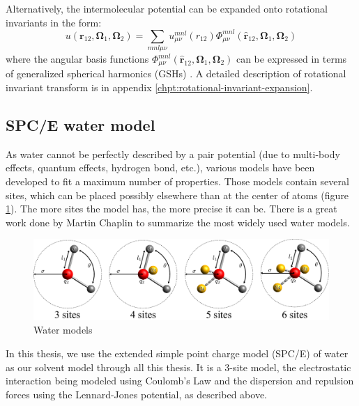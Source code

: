 Alternatively, the intermolecular potential can be expanded onto rotational
invariants in the form:
\begin{equation}
u(\mathbf{r}_{12},\mathbf{\Omega}_{1},\mathbf{\Omega}_{2})=\sum_{mnl\mu\nu}u_{\mu\nu}^{mnl}(r_{12})\Phi_{\mu\nu}^{mnl}(\hat{\mathbf{r}}_{12},\mathbf{\Omega}_{1},\mathbf{\Omega}_{2})
\end{equation}
where the angular basis functions $\Phi_{\mu\nu}^{mnl}(\hat{\mathbf{r}}_{12},\mathbf{\Omega}_{1},\mathbf{\Omega}_{2})$
can be expressed in terms of generalized spherical harmonics (\acs{GSH}s)
\citep{Gray-Gubbins}. A detailed description of rotational invariant
transform is in appendix \ref{chpt:rotational-invariant-expansion}.

\subsection{SPC/E water model}

As water cannot be perfectly described by a pair potential (due to
multi-body effects, quantum effects, hydrogen bond, etc.), various
models have been developed to fit a maximum number of properties.
Those models contain several sites, which can be placed possibly elsewhere
than at the center of atoms (figure \ref{fig:Water-models}). The
more sites the model has, the more precise it can be. There is a great
work done by Martin Chaplin \citep{water-model} to summarize the
most widely used water models.

\begin{figure}[h]
\begin{centering}
\includegraphics[width=0.85\columnwidth]{_figure/water}
\par\end{centering}
\caption{Water models\label{fig:Water-models}}
\end{figure}

In this thesis, we use the extended simple point charge model (SPC/E)
of water \citep{SPC/E} as our solvent model through all this thesis.
It is a 3-site model, the electrostatic interaction being modeled
using Coulomb's Law and the dispersion and repulsion forces using
the Lennard-Jones potential, as described above. 

